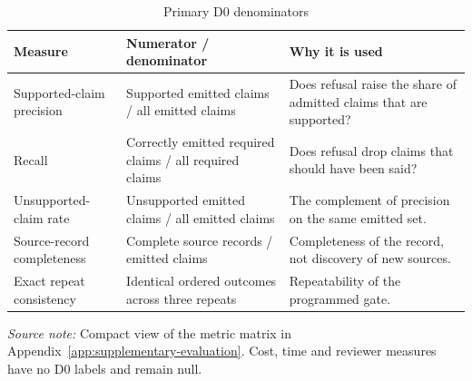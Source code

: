 \begin{table}[htbp]
  \centering
  \small
  \setlength{\tabcolsep}{3pt}
  \renewcommand{\arraystretch}{1.12}
  \begin{tabularx}{\textwidth}{@{}P{0.28\textwidth}P{0.32\textwidth}Y@{}}
    \toprule
    \textbf{Measure} & \textbf{Numerator / denominator} & \textbf{Why it is used} \\
    \midrule
    Supported-claim precision & Supported emitted claims / all emitted claims & Does refusal raise the share of admitted claims that are supported? \\
    Recall & Correctly emitted required claims / all required claims & Does refusal drop claims that should have been said? \\
    Unsupported-claim rate & Unsupported emitted claims / all emitted claims & The complement of precision on the same emitted set. \\
    Source-record completeness & Complete source records / emitted claims & Completeness of the record, not discovery of new sources. \\
    Exact repeat consistency & Identical ordered outcomes across three repeats & Repeatability of the programmed gate. \\
    \bottomrule
  \end{tabularx}
  \caption{Primary D0 denominators}
  \label{tab:meth-primary-denominators}
  \vspace{3pt}
  \parbox{\textwidth}{\scriptsize
    \textit{Source note:} Compact view of the metric matrix in
    Appendix~\ref{app:supplementary-evaluation}. Cost, time and reviewer measures have no D0 labels
    and remain null.}
\end{table}
